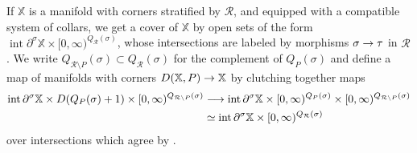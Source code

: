 \documentclass[10pt]{amsart}
\numberwithin{equation}{section}
\theoremstyle{definition}
\DeclareMathOperator{\interior}{int}
\newcommand{\bX}{\mathbb{X}}
\newcommand{\cR}{\mathcal{R}}
\newcommand{\del}{\partial}
\renewcommand{\to}{\mathchoice{\longrightarrow}{\rightarrow}{}{}}
\begin{document}
If $\bX$ is a manifold with corners stratified by $\cR$, and equipped with a compatible system of collars, we get a cover of $\bX$ by open sets of the form $\interior \del^{\sigma} \bX \times [0,\infty)^{Q_{\cR}(\sigma)}$, whose intersections are labeled by morphisms $\sigma \to \tau$ in $\cR$.
We write $Q_{\cR\setminus P}(\sigma) \subset Q_{\cR}(\sigma)$ for the complement of $Q_{P}(\sigma)$ and define a map of manifolds with corners $D(\bX, P) \to \bX$ by clutching together maps
\begin{align*}
	\interior \del^{\sigma} \bX \times D(Q_{P}(\sigma)+1) \times [0,\infty)^{Q_{\cR\setminus P}(\sigma)} &\to \interior \del^{\sigma} \bX \times [0,\infty)^{Q_{P}(\sigma)} \times [0,\infty)^{Q_{\cR\setminus P}(\sigma)} \\
	&\simeq  \interior \del^{\sigma} \bX \times [0,\infty)^{Q_{\cR}(\sigma)}
\end{align*}
over intersections which agree by .
\end{document}
